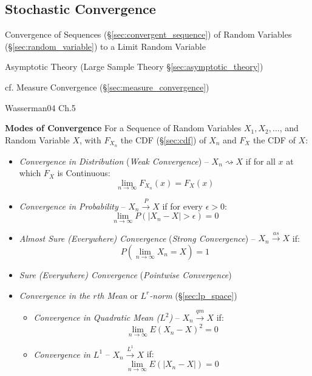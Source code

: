 \subsection{Stochastic Convergence}\label{sec:stochastic_convergence}

Convergence of Sequences (\S\ref{sec:convergent_sequence}) of Random Variables
(\S\ref{sec:random_variable}) to a Limit Random Variable

\fist Asymptotic Theory (Large Sample Theory \S\ref{sec:asymptotic_theory})

\fist cf. Measure Convergence (\S\ref{sec:measure_convergence})

Wasserman04 Ch.5

\textbf{Modes of Convergence}
For a Sequence of Random Variables $X_1, X_2, \ldots$, and Random Variable $X$,
with $F_{X_n}$ the CDF (\S\ref{sec:cdf}) of $X_n$ and $F_X$ the CDF of $X$:
\begin{itemize}
  \item \emph{Convergence in Distribution} (\emph{Weak Convergence}) --
    $X_n \rightsquigarrow X$ if for all $x$ at which $F_X$ is Continuous:
    \[
      \lim_{n\to\infty} F_{X_n}(x) = F_X(x)
    \]
  \item \emph{Convergence in Probability} -- $X_n \xrightarrow{P} X$ if for
    every $\epsilon > 0$:
    \[
      \lim_{n\to\infty}P(|X_n - X| > \epsilon) = 0
    \]
  \item \emph{Almost Sure (Everywhere) Convergence} (\emph{Strong Convergence})
    -- $X_n \xrightarrow{as} X$ if:
    \[
      P(\lim_{n\to\infty}X_n = X) = 1
    \]
  \item \emph{Sure (Everywhere) Convergence} (\emph{Pointwise Convergence})
  \item \emph{Convergence in the $r$th Mean} or \emph{$L^r$-norm}
    (\S\ref{sec:lp_space})
    \begin{itemize}
      \item \emph{Convergence in Quadratic Mean ($L^2$)} --
        $X_n \xrightarrow{qm} X$ if:
        \[
          \lim_{n\to\infty} E(X_n - X)^2 = 0
        \]
      \item \emph{Convergence in $L^1$} -- $X_n \xrightarrow{L^1} X$ if:
        \[
          \lim_{n\to\infty} E(|X_n - X|) = 0
        \]
    \end{itemize}
\end{itemize}

